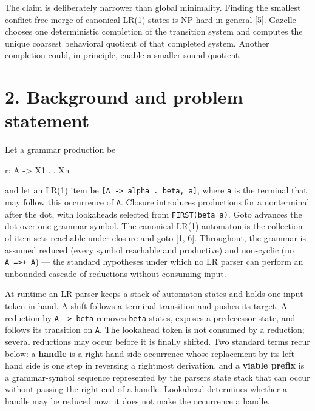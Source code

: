 \documentclass[
  10pt,
]{article}
\newenvironment{Shaded}{}{}
\newcommand{\NormalTok}[1]{#1}
\begin{document}
The claim is deliberately narrower than global minimality. Finding the
smallest conflict-free merge of canonical LR(1) states is NP-hard in
general {[}5{]}. Gazelle chooses one deterministic completion of the
transition system and computes the unique coarsest behavioral quotient
of that completed system. Another completion could, in principle, enable
a smaller sound quotient.

\hypertarget{2-background-and-problem-statement}{%
\section{2. Background and problem
statement}\label{2-background-and-problem-statement}}

Let a grammar production be

\begin{Shaded}
\begin{Highlighting}[]
\NormalTok{r: A {-}\textgreater{} X1 ... Xn}
\end{Highlighting}
\end{Shaded}

and let an LR(1) item be
\texttt{{[}A\ -\textgreater{}\ alpha\ .\ beta,\ a{]}}, where \texttt{a}
is the terminal that may follow this occurrence of \texttt{A}. Closure
introduces productions for a nonterminal after the dot, with lookaheads
selected from \texttt{FIRST(beta\ a)}. Goto advances the dot over one
grammar symbol. The canonical LR(1) automaton is the collection of item
sets reachable under closure and goto {[}1, 6{]}. Throughout, the
grammar is assumed reduced (every symbol reachable and productive) and
non-cyclic (no \texttt{A\ =\textgreater{}+\ A}) --- the standard
hypotheses under which no LR parser can perform an unbounded cascade of
reductions without consuming input.

At runtime an LR parser keeps a stack of automaton states and holds one
input token in hand. A shift follows a terminal transition and pushes
its target. A reduction by \texttt{A\ -\textgreater{}\ beta} removes
\texttt{\textbar{}beta\textbar{}} states, exposes a predecessor state,
and follows its transition on \texttt{A}. The lookahead token is not
consumed by a reduction; several reductions may occur before it is
finally shifted. Two standard terms recur below: a \textbf{handle} is a
right-hand-side occurrence whose replacement by its left-hand side is
one step in reversing a rightmost derivation, and a \textbf{viable
prefix} is a grammar-symbol sequence represented by the
parser\textquotesingle s state stack that can occur without passing the
right end of a handle. Lookahead determines whether a handle may be
reduced now; it does not make the occurrence a handle.
\end{document}
